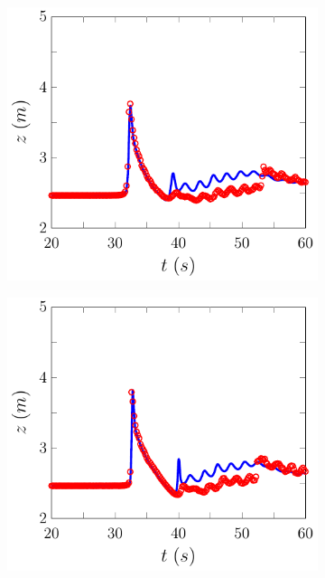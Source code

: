 \begin{figure}
	\centering
	\begin{subfigure}{0.5\textwidth}
		\includegraphics[width=\textwidth]{./chp6/figures/Experiment/Roeber/Trial8/FEVM/WG7-figure0.pdf}
		\vspace{0.5cm}
	\end{subfigure}%
	\begin{subfigure}{0.5\textwidth}
		\includegraphics[width=\textwidth]{./chp6/figures/Experiment/Roeber/Trial8/FEVM/WG8-figure0.pdf}

\end{subfigure}
\end{figure}
